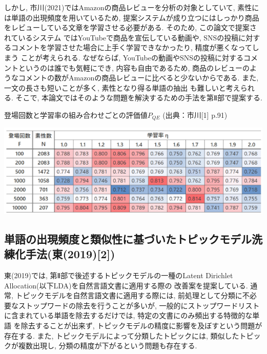 \documentclass{ltjarticle}
\begin{document}
しかし, 市川(2021)ではAmazonの商品レビューを分析の対象としていて, 素性には単語の出現頻度を用いているため, 
提案システムが成り立つにはしっかり商品をレビューしている文章を学習させる必要がある. そのため, この論文で提案されているシステム
ではYouTubeで商品を宣伝している動画や, SNSの投稿に対するコメントを学習させた場合に上手く学習できなかったり, 精度が悪くなってしまう
ことが考えられる. なぜならば, YouTubeの動画やSNSの投稿に対するコメントというのは誰でも気軽にでき, 内容も自由であるため, 
商品のレビューのようなコメントの数がAmazonの商品レビューに比べると少ないからである. また, 一文の長さも短いことが多く, 素性となり得る単語の抽出
も難しいと考えられる. そこで, 本論文ではそのような問題を解決するための手法を第Ⅱ部で提案する.
\begin{table}
    \centering
    \caption{登場回数と学習率の組み合わせごとの評価値$P_{QE}$ (出典：市川[1] p.91)}
    \includegraphics[width=14cm]{images/table1.png}
    \label{table:関連研究1結果}
\end{table}
\vspace{20truept}

\subsection{単語の出現頻度と類似性に基づいたトピックモデル洗練化手法(東(2019)[2])}
東(2019)では, 第Ⅱ部で後述するトピックモデルの一種のLatent Dirichlet Allocation(以下LDA)を自然言語文書に適用する際の
改善案を提案している. 
通常, トピックモデルを自然言語文書に適用する際には, 前処理として分類に不必要なストップワードの除去を行うことが多いが, 
一般的にストップワードリストに含まれている単語を除去するだけでは, 特定の文書にのみ頻出する特徴的な単語
を除去することが出来ず, トピックモデルの精度に影響を及ぼすという問題が存在する. 
また, トピックモデルによって分類したトピックには, 類似したトピックが複数出現し, 
分類の精度が下がるという問題も存在する. 
\end{document}
